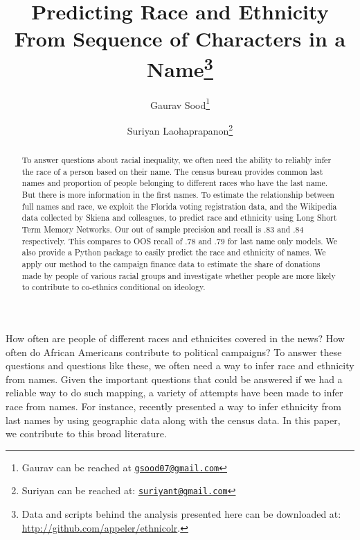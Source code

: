 \documentclass[12pt, letterpaper]{article}
\title{\Large{Predicting Race and Ethnicity From Sequence of Characters in a Name}\footnote{Data and scripts behind the analysis presented here can be downloaded at: \url{http://github.com/appeler/ethnicolr}.
}}
\author{Gaurav Sood\thanks{Gaurav can be reached at \href{mailto:gsood07@gmail.com}{\footnotesize{\texttt{gsood07@gmail.com}}}} \and Suriyan Laohaprapanon\thanks{Suriyan can be reached at: \href{mailto:suriyant@gmail.com}{\footnotesize{\texttt{suriyant@gmail.com}}}}\vspace{.5cm}}
\date{}
\begin{document}
\maketitle

\begin{center}
\end{center}

\begin{comment}

setwd(paste0(githubdir, "ethnicolr_paper/"))
tools::texi2dvi("name_race.tex", pdf = TRUE, clean = TRUE) 
setwd(basedir)

\end{comment}


\begin{abstract}
To answer questions about racial inequality, we often need the ability to reliably infer the race of a person based on their name. The census bureau provides common last names and proportion of people belonging to different races who have the last name. But there is more information in the first names. To estimate the relationship between full names and race, we exploit the Florida voting registration data, and the Wikipedia data collected by Skiena and colleagues, to predict race and ethnicity using Long Short Term Memory Networks. Our out of sample precision and recall is .83 and .84 respectively. This compares to OOS recall of .78 and .79 for last name only models. We also provide a Python package to easily predict the race and ethnicity of names. We apply our method to the campaign finance data to estimate the share of donations made by people of various racial groups and investigate whether people are more likely to contribute to co-ethnics conditional on ideology.
\end{abstract}
\clearpage
\doublespace

How often are people of different races and ethnicites covered in the news? How often do African Americans contribute to political campaigns? To answer these questions and questions like these, we often need a way to infer race and ethnicity from names. Given the important questions that could be answered if we had a reliable way to do such mapping, a variety of attempts have been made to infer race from names. For instance, recently \citet{imai2016improving} presented a way to infer ethnicity from last names by using geographic data along with the census data. In this paper, we contribute to this broad literature. 
\end{document}
